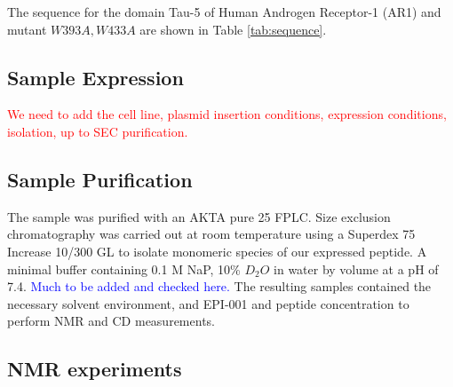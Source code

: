 The sequence for the domain Tau-5 of Human Androgen Receptor-1 (AR1) and mutant $W393A,W433A$ are shown in Table \ref{tab:sequence}. 



\subsection{Sample Expression}
\textcolor{red}{We need to add the cell line, plasmid insertion conditions, expression conditions, isolation, up to SEC purification.}


\subsection{Sample Purification}
The sample was purified with an AKTA pure 25 FPLC. 
Size exclusion chromatography was carried out at room temperature using a Superdex 75 Increase 10/300 GL to isolate monomeric species of our expressed peptide. 
A minimal buffer containing 0.1 M NaP, 10\% $D_2O$ in water by volume at a pH of 7.4. \textcolor{blue}{Much to be added and checked here. }
The resulting samples contained the necessary solvent environment, and EPI-001 and peptide concentration to perform NMR and CD measurements. 

\subsection{NMR experiments}
